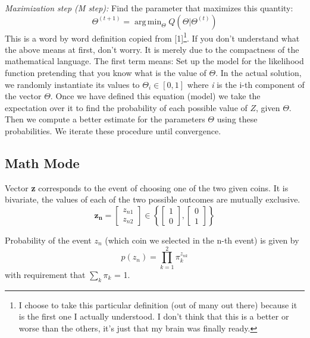 \documentclass[11pt]{article}
\theoremstyle{plain}
\theoremstyle{definition}
\DeclareMathOperator*{\argminA}{arg\,min}
\begin{document}
\textit{Maximization step (M step):} Find the parameter that maximizes this quantity:
\begin{equation}
\Theta^{(t+1)}=\argminA_\Theta Q(\Theta|\Theta^{(t)})
\end{equation}
This is a word by word definition copied from [1]\footnote{I choose to take this particular definition (out of many out there) because it is the first one I actually understood. I don't think that this is a better or worse than the others, it's just that my brain was finally ready.}.
If you don't understand what the above means at first, don't worry. It is merely due to the compactness of the mathematical language. The first term means: Set up the model for the likelihood function pretending that you know what is the value of $\Theta$. In the actual solution, we randomly instantiate its values to $\Theta_i \in [0,1]$ where \textit{i} is the i-th component of the vector $\Theta$. Once we have defined this equation (model) we take the expectation over it to find the probability of each possible value of $Z$, given $\Theta$. Then we compute a better estimate for the parameters $\Theta$ using these probabilities. We iterate these procedure until convergence.
\subsection{Math Mode}\label{section:mathmode}
Vector \textbf{z} corresponds to the event of choosing one of the two given coins. It is bivariate, the values of each of the two possible outcomes are mutually exclusive.
\begin{equation}
\bm{z_{n}} = \begin{bmatrix}
z_{n1} \\
z_{n2}
\end{bmatrix}
\in \left \{
\begin{bmatrix}
{1} \\
{0}
\end{bmatrix},
\begin{bmatrix}
{0} \\
{1}
\end{bmatrix}
\right \}
\end{equation}

Probability of the event $z_n$ (which coin we selected in the n-th event) is given by
\begin{equation}
p(z_{n}) = \prod_{k=1}^{2} \pi_{k}^{z_{nk}}
\end{equation}
with requirement that $\sum_{k}\pi_{k}$ = 1.
\end{document}
